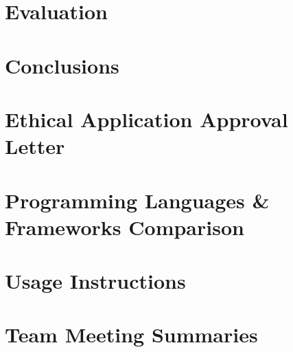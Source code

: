 \documentclass[11pt,openright,twoside,a4paper]{report}
\begin{document}
\chapter{Evaluation}
\label{ch:chapter-evaluation}


\chapter{Conclusions}
\label{ch:chapter-conclusions}




\appendix

\chapter{Ethical Application Approval Letter}
\label{ch:appendix-ethical-approval-letter}


\chapter{Programming Languages \& Frameworks Comparison}


\chapter{Usage Instructions}
\label{ch:appendix-usage-instructions}


\chapter{Team Meeting Summaries}
\label{ch:appendix-team-meeting-summaries}

\end{document}
